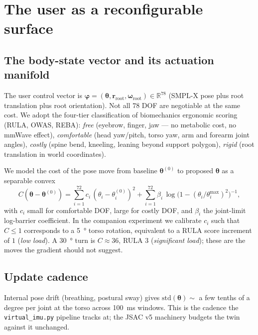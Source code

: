 \documentclass[11pt,a4paper]{article}
\theoremstyle{definition}
\newcommand{\rr}{\mathbf{r}}
\newcommand{\Reals}{\mathbb{R}}
\newcommand{\thetab}{\bm{\theta}}
\begin{document}
\section{The user as a reconfigurable surface}\label{sec:user}

\subsection{The body-state vector and its actuation manifold}

The user control vector is
$\bm\varphi=(\thetab,\rr_{\mathrm{root}},\bm\omega_{\mathrm{root}})
\in\Reals^{78}$ (SMPL-X pose plus root translation plus root
orientation).  Not all $78$ DOF are negotiable at the same cost.
We adopt the four-tier classification of biomechanics ergonomic
scoring (RULA, OWAS, REBA): \emph{free} (eyebrow, finger, jaw —
no metabolic cost, no mmWave effect), \emph{comfortable} (head
yaw/pitch, torso yaw, arm and forearm joint angles),
\emph{costly} (spine bend, kneeling, leaning beyond support
polygon), \emph{rigid} (root translation in world coordinates).

We model the cost of the pose move from baseline $\thetab^{(0)}$
to proposed $\thetab$ as a separable convex
\begin{equation}\label{eq:movement-cost}
  C(\thetab-\thetab^{(0)})
   = \sum_{i=1}^{72}c_i\,(\theta_i-\theta_i^{(0)})^2
   + \sum_{i=1}^{72}\beta_i\,
       \log\!\bigl(1-(\theta_i/\theta_i^{\max})^2\bigr)^{-1},
\end{equation}
with $c_i$ small for comfortable DOF, large for costly DOF, and
$\beta_i$ the joint-limit log-barrier coefficient.  In the
companion experiment we calibrate $c_i$ such that $C\le 1$
corresponds to a \SI{5}{\degree} torso rotation, equivalent to a
RULA score increment of $1$ (\emph{low load}).  A \SI{30}{\degree}
turn is $C\approx 36$, RULA $3$ (\emph{significant load}); these
are the moves the gradient should not suggest.

\subsection{Update cadence}

Internal pose drift (breathing, postural sway) gives
$\mathrm{std}(\thetab)\sim$ a few tenths of a degree per joint at
the torso across \SI{100}{ms} windows.  This is the cadence the
\texttt{virtual\_imu.py} pipeline tracks at; the JSAC v5 machinery
budgets the twin against it unchanged.
\end{document}
